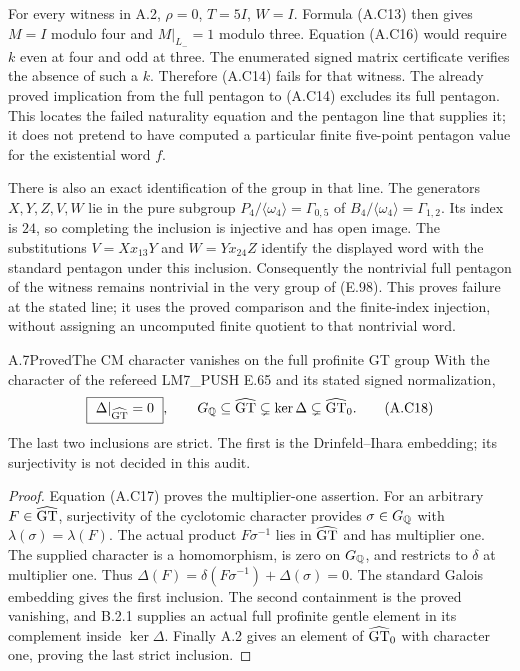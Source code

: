 For every witness in A.2, $\rho=0$, $T=5I$, $W=I$.
Formula (A.C13) then gives $M=I$ modulo four and $M|_{L_-}=1$
modulo three. Equation (A.C16) would require $k$ even at four and
odd at three. The enumerated signed matrix certificate verifies
the absence of such a $k$. Therefore (A.C14) fails for that
witness. The already proved implication from the full pentagon
to (A.C14) excludes its full pentagon. This locates the failed
naturality equation and the pentagon line that supplies it; it
does not pretend to have computed a particular finite five-point
pentagon value for the existential word $f$.

There is also an exact identification of the group in that line.
The generators $X,Y,Z,V,W$ lie in the pure subgroup
$P_4/\langle\omega_4\rangle=\Gamma_{0,5}$ of
$B_4/\langle\omega_4\rangle=\Gamma_{1,2}$. Its index is
$24$, so completing the inclusion is injective and has open
image. The substitutions $V=Xx_{13}Y$ and $W=Yx_{24}Z$
identify the displayed word with the standard pentagon under
this inclusion. Consequently the nontrivial full pentagon of
the witness remains nontrivial in the very group of (E.98).
This proves failure at the stated line; it uses the proved
comparison and the finite-index injection, without assigning
an uncomputed finite quotient to that nontrivial word.

\begin{result}{A.7}{Proved}{The CM character vanishes on the full profinite GT group}
With the character of the refereed LM7\_PUSH E.65 and its stated
signed normalization,
\[
 \boxed{\ \Delta|_{\widehat{\mathrm{GT}}}=0\ },\qquad
 G_{\mathbb Q}\subseteq\widehat{\mathrm{GT}}\subsetneq\ker\Delta\subsetneq\widehat{\mathrm{GT}}_0.
 \tag{A.C18}
\]
The last two inclusions are strict. The first is the
Drinfeld--Ihara embedding; its surjectivity is not decided
in this audit.
\end{result}
\begin{proof}
Equation (A.C17) proves the multiplier-one assertion. For an
arbitrary $F\in\widehat{\mathrm{GT}}$, surjectivity of the cyclotomic character
provides $\sigma\in G_{\mathbb Q}$ with $\lambda(\sigma)=\lambda(F)$.
The actual product $F\sigma^{-1}$ lies in $\widehat{\mathrm{GT}}$ and has
multiplier one. The supplied character is a homomorphism, is
zero on $G_{\mathbb Q}$, and restricts to $\delta$ at multiplier one.
Thus $\Delta(F)=\delta(F\sigma^{-1})+\Delta(\sigma)=0$.
The standard Galois embedding gives the first inclusion.
The second containment is the proved vanishing, and B.2.1
supplies an actual full profinite gentle element in its
complement inside $\ker\Delta$. Finally A.2 gives an element
of $\widehat{\mathrm{GT}}_0$ with character one, proving the last strict inclusion.
\end{proof}
